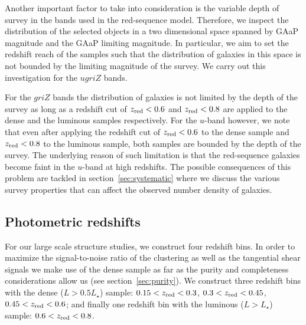 \documentclass[fleqn,usenatbib,useAMS]{mnras}
\begin{document}


Another important factor to take into consideration is the variable depth of survey in the bands used in the red-sequence model. Therefore, we inspect the distribution of the selected objects in a two dimensional space spanned by GAaP magnitude and the GAaP limiting magnitude. In particular, we aim to set the redshift reach of the samples such that the distribution of galaxies in this space is not bounded by the limiting magnitude of the survey. We carry out this investigation for the $ugriZ$ bands. 

For the $griZ$ bands the distribution of galaxies is not limited by the depth of the survey as long as a redshift cut of $z_{\rm red} < 0.6$ and $z_{\rm red} < 0.8$ are applied to the dense and the luminous samples respectively. 
For the $u$-band however, we note that even after applying the redshift cut of $z_{\rm red} < 0.6$ to the dense sample and $z_{\rm red} < 0.8$ to the luminous sample, both samples are bounded by the depth of the survey. The underlying reason of such limitation is that the red-sequence galaxies become faint in the $u$-band at high redshifts. The possible consequences of this problem are tackled in section~\ref{sec:systematic} where we discuss the various survey properties that can affect the observed number density of galaxies.

\subsection{Photometric redshifts}

For our large scale structure studies, we construct four redshift bins. 
In order to maximize the signal-to-noise ratio of the clustering as well as the tangential shear signals we make use of the dense sample as far as the purity and completeness considerations allow us (see section~\ref{sec:purity}). We construct three redshift bins with the dense ($L > 0.5 L_{\star}$) sample: $0.15<z_{\rm red}<0.3$, $0.3<z_{\rm red}<0.45$, $0.45<z_{\rm red}<0.6$; and finally one redshift bin with the luminous ($L > L_{\star}$) sample: $0.6<z_{\rm red}<0.8$.


\end{document}
